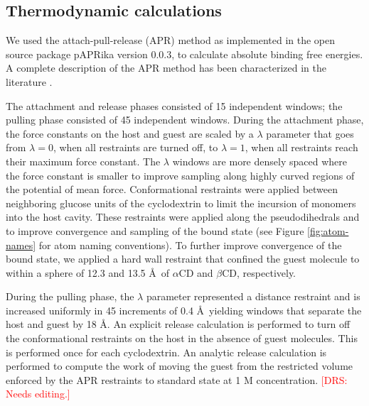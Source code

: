 \documentclass[9pt,lineno]{elife}
\newcommand{\drsnote}[1]{ {\textcolor{red} { [DRS: #1] }}}
\newcommand{\drsnote}[1]{}
\begin{document}
\subsection{Thermodynamic calculations}

We used the attach-pull-release (APR) method as implemented in the open source package pAPRika version 0.0.3, to calculate absolute binding free energies.
A complete description of the APR method has been characterized in the literature \cite{henriksen_computational_2015, velez-vega_overcoming_2013, muddana_sampl4_2014, fenley_bridging_2014}.

The attachment and release phases consisted of 15 independent windows; the pulling phase consisted of 45 independent windows.
During the attachment phase, the force constants on the host and guest are scaled by a $\lambda$ parameter that goes from $\lambda = 0$, when all restraints are turned off, to $\lambda = 1$, when all restraints reach their maximum force constant. The $\lambda$ windows are more densely spaced where the force constant is smaller to improve sampling along highly curved regions of the potential of mean force.
Conformational restraints were applied between neighboring glucose units of the cyclodextrin to limit the incursion of monomers into the host cavity. These restraints were applied along the pseudodihedrals  and  to improve convergence and sampling of the bound state (see Figure \ref{fig:atom-names} for atom naming conventions). To further improve convergence of the bound state, we applied a hard wall restraint that confined the guest molecule to within a sphere of 12.3 and 13.5 \AA\ of $\alpha$CD and $\beta$CD, respectively. 

During the pulling phase, the $\lambda$ parameter represented a distance restraint and is increased uniformly in 45 increments of 0.4 \AA\, yielding windows that separate the host and guest by 18 \AA. An explicit release calculation is performed to turn off the conformational restraints on the host in the absence of guest molecules. This is performed once for each cyclodextrin. An analytic release calculation is performed to compute the work of moving the guest from the restricted volume enforced by the APR restraints to standard state at 1 M concentration. \drsnote{Needs editing.}
\end{document}
